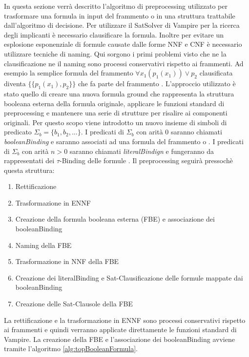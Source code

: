 \documentclass[./main.tex]{subfiles}
\begin{document}
In questa sezione verrà descritto l'algoritmo di preprocessing utilizzato per trasformare una formula in input
del frammento \ob o \cb in una struttura trattabile dall'algoritmo di decisione.
Per utilizzare il SatSolver di Vampire per la ricerca degli implicanti è necessario clausificare la formula.
Inoltre per evitare un esplosione esponenziale di formule causate dalle forme NNF e CNF è necessario utilizzare tecniche di naming.
Qui sorgono i primi problemi visto che ne la clausificazione ne il naming sono processi conservativi rispetto ai frammenti.
Ad esempio la semplice formula del frammento \ob $\forall x_1 (p_1(x_1)) \lor p_2$ clausificata diventa  $\{\{p_1(x_1), p_2\}\}$ che fa parte del frammento \dbb.
L'approccio utilizzato è stato quello di creare una nuova formula ground che rappresenta la struttura booleana esterna della formula originale,
applicare le funzioni standard di preprocessing
e mantenere una serie di strutture per risalire ai componenti originali.
Per questo scopo viene introdotto un nuovo insieme di simboli di predicato $\Sigma_b = \{b_1, b_2, ...\}$.
I predicati di $\Sigma_b$ con arità 0 saranno chiamati \textit{booleanBinding} e saranno associati ad una formula del frammento \ob o \cb.
I predicati di $\Sigma_b$ con arità $n > 0$ saranno chiamati \textit{literalBindign} e fungeranno da rappresentati dei $\tau$-Binding delle formule \ob.
Il preprocessing seguirà pressochè questa struttura:

\begin{enumerate}
    \item Rettificazione
    \item Trasformazione in ENNF
    \item Creazione della formula booleana esterna (FBE) e associazione dei booleanBinding
    \item Naming della FBE
    \item Trasformazione in NNF della FBE
    \item Creazione dei literalBinding e Sat-Clausificazione delle formule mappate dai booleanBinding
    \item Creazione delle Sat-Clausole della FBE
\end{enumerate}

La rettificazione e la trasformazione in ENNF sono processi conservativi rispetto ai frammenti e quindi verranno applicate 
direttamente le funzioni standard di Vampire.
La creazione della FBE e l'associazione dei booleanBinding avviene tramite l'algoritmo \ref{alg:topBooleanFormula}.
\end{document}
